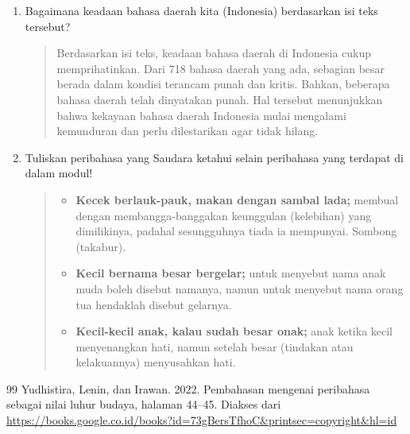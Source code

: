 \documentclass[12pt]{article}
\begin{document}
\begin{enumerate}
\item Bagaimana keadaan bahasa daerah kita (Indonesia) berdasarkan isi teks tersebut?
\begin{quote}
    Berdasarkan isi teks, keadaan bahasa daerah di Indonesia cukup memprihatinkan. Dari 718 bahasa daerah yang ada, sebagian besar berada dalam kondisi terancam punah dan kritis. Bahkan, beberapa bahasa daerah telah dinyatakan punah. Hal tersebut menunjukkan bahwa kekayaan bahasa daerah Indonesia mulai mengalami kemunduran dan perlu dilestarikan agar tidak hilang.
\end{quote}
\item Tuliskan peribahasa yang Saudara ketahui selain peribahasa yang terdapat di dalam modul!
\begin{quote}
    \begin{itemize}
        \item \textbf{Kecek berlauk-pauk, makan dengan sambal lada;} membual dengan membangga-banggakan keunggulan (kelebihan) yang dimilikinya, padahal sesungguhnya tiada ia mempunyai. Sombong (takabur).
        \item \textbf{Kecil bernama besar bergelar;} untuk menyebut nama anak muda boleh disebut namanya, namun untuk menyebut nama orang tua hendaklah disebut gelarnya.
        \item \textbf{Kecil-kecil anak, kalau sudah besar onak;} anak ketika kecil menyenangkan hati, namun setelah besar (tindakan atau kelakuannya) menyusahkan hati.
    \end{itemize}
\end{quote}

\end{enumerate}



\begin{thebibliography}{99}
    \bibitem{}
    Yudhistira, Lenin, dan Irawan. 2022. Pembahasan mengenai peribahasa sebagai nilai luhur budaya, halaman 44--45. Diakses dari \url{https://books.google.co.id/books?id=73gBersTfhoC&printsec=copyright&hl=id}

\end{thebibliography}
\end{document}
